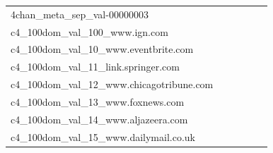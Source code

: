 \documentclass[dvipsnames]{article}
\begin{document}
\begin{appendix}
{\begin{longtable}{m{6cm}m{1.7cm}m{1.7cm}m{1.7cm}m{1.7cm}m{1.7cm}}
	4chan\_meta\_sep\_val-00000003  & \colorbox[HTML]{81c97c}{\makebox[\mywidth][c]{9.78}} & \colorbox[HTML]{c6e89a}{\makebox[\mywidth][c]{9.93}} & \colorbox[HTML]{ffffe5}{\makebox[\mywidth][c]{11.48}} & \colorbox[HTML]{7cc77a}{\makebox[\mywidth][c]{9.77}} & \colorbox[HTML]{77c578}{\makebox[\mywidth][c]{9.77}}\\
	c4\_100dom\_val\_100\_www.ign.com  & \colorbox[HTML]{fdfede}{\makebox[\mywidth][c]{16.22}} & \colorbox[HTML]{eaf7af}{\makebox[\mywidth][c]{15.75}} & \colorbox[HTML]{ffffe5}{\makebox[\mywidth][c]{17.10}} & \colorbox[HTML]{ddf1a6}{\makebox[\mywidth][c]{15.67}} & \colorbox[HTML]{77c578}{\makebox[\mywidth][c]{15.43}}\\
	c4\_100dom\_val\_10\_www.eventbrite.com  & \colorbox[HTML]{fdfedf}{\makebox[\mywidth][c]{12.72}} & \colorbox[HTML]{e6f5ad}{\makebox[\mywidth][c]{12.33}} & \colorbox[HTML]{ffffe5}{\makebox[\mywidth][c]{13.33}} & \colorbox[HTML]{dff2a7}{\makebox[\mywidth][c]{12.30}} & \colorbox[HTML]{77c578}{\makebox[\mywidth][c]{12.12}}\\
	c4\_100dom\_val\_11\_link.springer.com  & \colorbox[HTML]{fbfdd0}{\makebox[\mywidth][c]{8.66}} & \colorbox[HTML]{f2fab5}{\makebox[\mywidth][c]{8.54}} & \colorbox[HTML]{ffffe5}{\makebox[\mywidth][c]{9.31}} & \colorbox[HTML]{c5e799}{\makebox[\mywidth][c]{8.42}} & \colorbox[HTML]{77c578}{\makebox[\mywidth][c]{8.33}}\\
	c4\_100dom\_val\_12\_www.chicagotribune.com  & \colorbox[HTML]{ffffe5}{\makebox[\mywidth][c]{12.09}} & \colorbox[HTML]{eff8b3}{\makebox[\mywidth][c]{11.60}} & \colorbox[HTML]{ffffe5}{\makebox[\mywidth][c]{12.49}} & \colorbox[HTML]{e3f4aa}{\makebox[\mywidth][c]{11.55}} & \colorbox[HTML]{77c578}{\makebox[\mywidth][c]{11.37}}\\
	c4\_100dom\_val\_13\_www.foxnews.com  & \colorbox[HTML]{ffffe5}{\makebox[\mywidth][c]{9.59}} & \colorbox[HTML]{e7f5ad}{\makebox[\mywidth][c]{9.21}} & \colorbox[HTML]{ffffe5}{\makebox[\mywidth][c]{9.83}} & \colorbox[HTML]{d0ec9e}{\makebox[\mywidth][c]{9.16}} & \colorbox[HTML]{77c578}{\makebox[\mywidth][c]{9.08}}\\
	c4\_100dom\_val\_14\_www.aljazeera.com  & \colorbox[HTML]{ffffe5}{\makebox[\mywidth][c]{10.97}} & \colorbox[HTML]{f5fbb8}{\makebox[\mywidth][c]{10.61}} & \colorbox[HTML]{ffffe5}{\makebox[\mywidth][c]{11.31}} & \colorbox[HTML]{ceeb9e}{\makebox[\mywidth][c]{10.50}} & \colorbox[HTML]{77c578}{\makebox[\mywidth][c]{10.40}}\\
	c4\_100dom\_val\_15\_www.dailymail.co.uk  & \colorbox[HTML]{fefee3}{\makebox[\mywidth][c]{12.42}} & \colorbox[HTML]{f6fbb8}{\makebox[\mywidth][c]{11.97}} & \colorbox[HTML]{ffffe5}{\makebox[\mywidth][c]{12.87}} & \colorbox[HTML]{daf0a4}{\makebox[\mywidth][c]{11.85}} & \colorbox[HTML]{77c578}{\makebox[\mywidth][c]{11.69}}\\

\end{longtable}}
\end{appendix}
\end{document}
